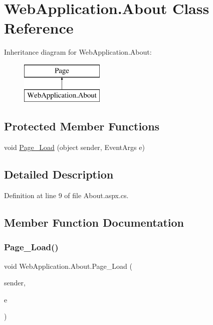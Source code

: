 \hypertarget{classWebApplication_1_1About}{}\section{Web\+Application.\+About Class Reference}
\label{classWebApplication_1_1About}
Inheritance diagram for Web\+Application.\+About\+:\begin{figure}[H]
\begin{center}
\leavevmode
\includegraphics[height=2.000000cm]{db/d5c/classWebApplication_1_1About}
\end{center}
\end{figure}
\subsection*{Protected Member Functions}
\begin{DoxyCompactItemize}
\item 
void \mbox{\hyperlink{classWebApplication_1_1About_ab4ff9f7fcbc304d508c0ae1b96e585c7}{Page\+\_\+\+Load}} (object sender, Event\+Args e)
\end{DoxyCompactItemize}


\subsection{Detailed Description}


Definition at line 9 of file About.\+aspx.\+cs.



\subsection{Member Function Documentation}
\mbox{\label{classWebApplication_1_1About_ab4ff9f7fcbc304d508c0ae1b96e585c7}} 
\subsubsection{\texorpdfstring{Page\_Load()}{Page\_Load()}}
{\footnotesize\ttfamily void Web\+Application.\+About.\+Page\+\_\+\+Load (\begin{DoxyParamCaption}\item[{object}]{sender,  }\item[{Event\+Args}]{e }\end{DoxyParamCaption})\hspace{0.3cm}{\ttfamily [protected]}}



